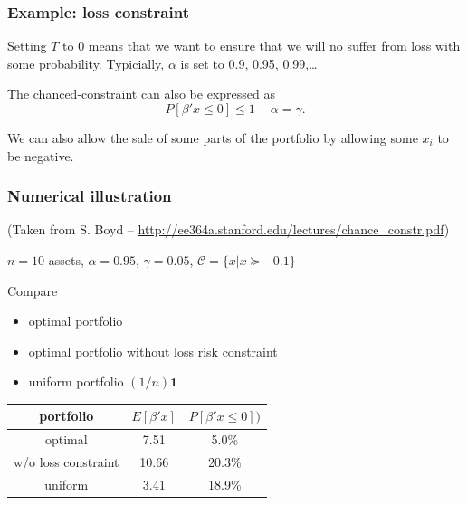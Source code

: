 \documentclass{beamer}
\begin{document}
\begin{frame}
\frametitle{Example: loss constraint}

Setting $T$ to 0 means that we want to ensure that we will no suffer from loss with some probability. Typicially, $\alpha$ is set to 0.9, 0.95, 0.99,\ldots

\mbox{}

The chanced-constraint can also be expressed as
\[
P\left[ \beta' x \leq 0 \right] \leq 1-\alpha = \gamma.
\]

\mbox{}

We can also allow the sale of some parts of the portfolio by allowing some $x_i$ to be negative.
\end{frame}

\begin{frame}
\frametitle{Numerical illustration}

(Taken from S. Boyd -- \url{http://ee364a.stanford.edu/lectures/chance_constr.pdf})

$n = 10$ assets, $\alpha = 0.95$, $\gamma = 0.05$, $\mathcal{C} = \{x | x \succeq -0.1\}$

\mbox{}

Compare
\begin{itemize}
\item
optimal portfolio
\item
optimal portfolio without loss risk constraint
\item
uniform portfolio $(1/n)\mathbf{1}$
\end{itemize}

\mbox{}

\begin{center}
\begin{tabular}{c|c|c}
portfolio & $E[\beta'x]$ & $P[\beta' x \leq 0])$ \\
\hline
optimal & 7.51 & 5.0\% \\
w/o loss constraint & 10.66 & 20.3\% \\
uniform & 3.41 & 18.9\%
\end{tabular}
\end{center}

\end{frame}
\end{document}
